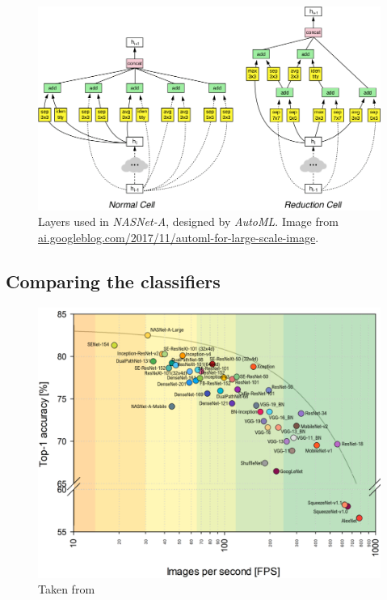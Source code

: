 \begin{figure}
    \includegraphics[width=\textwidth]{img/nasnet}
    \caption{Layers used in \textit{NASNet-A}, designed by \textit{AutoML}. Image from \url{ai.googleblog.com/2017/11/automl-for-large-scale-image}.}
    \label{fig:nasnet}
\end{figure}

\subsection{Comparing the classifiers}

\begin{figure}
    \includegraphics[width=\textwidth]{img/fps_comp}
    \caption{Taken from \cite[fig. 3]{bib:cnnbenchmark}}
    \label{fig:cnnbenchmark}
\end{figure}

